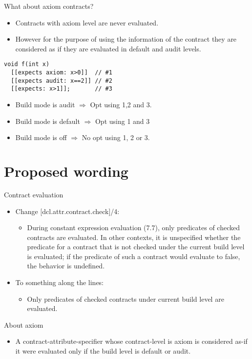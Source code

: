 \begin{frame}[t,fragile]{What about axiom contracts?}
\begin{itemize}
\item Contracts with axiom level are never evaluated. 
\item However for the purpose of using the information of the contract 
they are considered as if they are evaluated in default and audit levels.
\end{itemize}
\begin{lstlisting}
void f(int x)
  [[expects axiom: x>0]]  // #1
  [[expects audit: x==2]] // #2
  [[expects: x>1]];       // #3
\end{lstlisting}
\begin{itemize}
  \item Build mode is audit $\Rightarrow$ Opt using 1,2 and 3.
  \item Build mode is default $\Rightarrow$ Opt using 1 and 3
  \item Build mode is off $\Rightarrow$ No opt using 1, 2 or 3.
\end{itemize}
\end{frame}

\section{Proposed wording}

\begin{frame}[t]{Contract evaluation}
\begin{itemize}
  \item Change [dcl.attr.contract.check]/4:
    \begin{itemize}
\item During constant expression evaluation (7.7), only predicates of checked contracts are evaluated. In other contexts, it is unspecified whether the predicate for a contract that is not checked under the current build level is evaluated; if the predicate of such a contract would evaluate to false, the behavior is undefined.
    \end{itemize}
\item To something along the lines:
\begin{itemize}
\item Only predicates of checked contracts under current build level are evaluated.
\end{itemize}
\end{itemize}
\end{frame}

\begin{frame}[t]{About axiom}
\begin{itemize}
\item A contract-attribute-specifier whose contract-level is axiom is considered as-if it were evaluated only if the build level is default or audit.
\end{itemize}
\end{frame}
